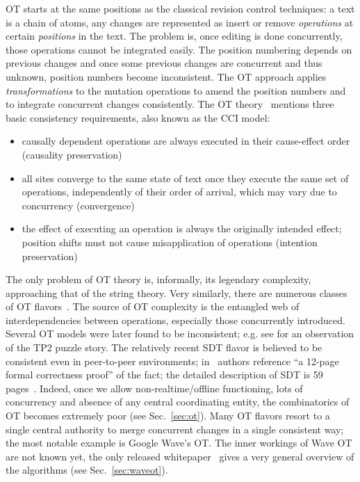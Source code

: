 \documentclass{acm_proc_article-sp}
\begin{document}
OT starts at the same positions as the classical revision control techniques: a text is a chain of atoms, any changes are represented as insert or remove \emph{operations} at certain \emph{positions} in the
text.
The problem is, once editing is done concurrently, those operations cannot be integrated easily.
The position numbering depends on previous changes and once some previous changes are concurrent and thus unknown, position numbers become inconsistent.
The OT approach applies \emph{transformations} to the mutation operations to amend the position numbers and to integrate concurrent changes consistently. The OT theory~\cite{sun-achieving} mentions three basic consistency requirements, also known as the CCI model: 
\begin{itemize}
\item causally dependent operations are always executed in their cause-effect order (causality preservation)
\item all sites converge to the same state of text once they execute the same set of operations, independently of their order of arrival, which may vary due to concurrency (convergence)
\item the effect of executing an operation is always the originally intended effect; position shifts must not cause misapplication of operations (intention preservation)
\end{itemize}
The only problem of OT theory is, informally, its legendary complexity, approaching that of the string theory.
Very similarly, there are numerous classes of OT flavors~\cite{ot}.
The source of OT complexity is the entangled web of interdependencies between operations, especially those concurrently introduced.
Several OT models were later found to be inconsistent; e.g. see \cite{woot,molli-proving} for an observation of the TP2 puzzle story.
The relatively recent SDT flavor is believed to be consistent even in peer-to-peer environments; in~\cite{lili-preserving} authors reference ``a 12-page formal correctness proof'' of the fact; the detailed description of SDT is 59 pages~\cite{lili-ensuring}.
Indeed, once we allow non-realtime/offline functioning, lots of concurrency and absence of any central coordinating entity, the combinatorics of OT becomes extremely poor (see Sec.~\ref{sec:ot}).
Many OT flavors resort to a single central authority to merge concurrent changes in a single consistent way; the most notable example is Google Wave's OT.
The inner workings of Wave OT are not known yet, the only released whitepaper~\cite{waveot} gives a very general overview of the algorithms (see Sec.~\ref{sec:waveot}).
\end{document}
